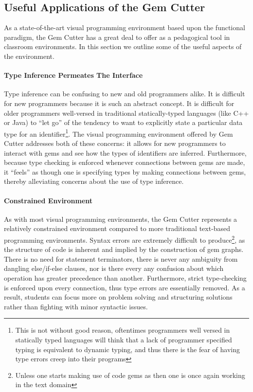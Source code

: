 \subsection{Useful Applications of the Gem Cutter}
\label{sec:gemCutterUsefulApps}

As a state-of-the-art visual programming environment based upon the functional paradigm, the Gem Cutter has a great deal to offer as a pedagogical tool in classroom environments.  In this section we outline some of the useful aspects of the environment.

\paragraph{Type Inference Permeates The Interface} 

Type inference can be confusing to new and old programmers alike.  It is difficult for new programmers because it is such an abstract concept.  It is difficult for older programmers well-versed in traditional statically-typed languages (like C++ or Java) to ``let go'' of the tendency to want to explicitly state a particular data type for an identifier\footnote{This is not without good reason, oftentimes programmers well versed in statically typed languages will think that a lack of programmer specified typing is equivalent to dynamic typing, and thus there is the fear of having type errors creep into their programs}.  The visual programming environment offered by Gem Cutter addresses both of these concerns: it allows for new programmers to interact with gems and see how the types of identifiers are inferred.  Furthermore, because type checking is enforced whenever connections between gems are made, it ``feels'' as though one is specifying types by making connections between gems, thereby alleviating concerns about the use of type inference.

\paragraph{Constrained Environment}

As with most visual programming environments, the Gem Cutter represents a relatively constrained environment compared to more traditional text-based programming environments.  Syntax errors are extremely difficult to produce\footnote{Unless one starts making use of code gems as then one is once again working in the text domain}, as the structure of code is inherent and implied by the construction of gem graphs.  There is no need for statement terminators, there is never any ambiguity from dangling else/if-else clauses, nor is there every any confusion about which operation has greater precedence than another.  Furthermore, strict type-checking is enforced upon every connection, thus type errors are essentially removed.  As a result, students can focus more on problem solving and structuring solutions rather than fighting with minor syntactic issues.

